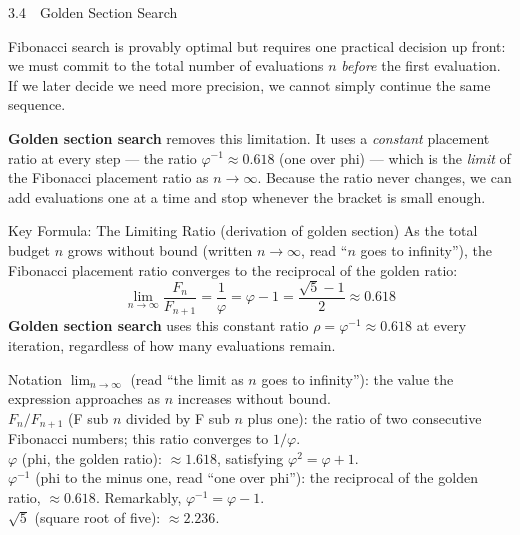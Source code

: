 \documentclass[aspectratio=169,10pt]{beamer}
\begin{document}
\begin{frame}[allowframebreaks]{3.4\ \ Golden Section Search}

  Fibonacci search is provably optimal but requires one practical decision
  up front: we must commit to the total number of evaluations $n$
  \emph{before} the first evaluation.  If we later decide we need more
  precision, we cannot simply continue the same sequence.

  \textbf{Golden section search} removes this limitation.  It uses a
  \emph{constant} placement ratio at every step --- the ratio $\varphi^{-1}
  \approx 0.618$ (one over phi) --- which is the \emph{limit} of the
  Fibonacci placement ratio as $n \to \infty$.  Because the ratio never
  changes, we can add evaluations one at a time and stop whenever the
  bracket is small enough.

  \begin{block}{Key Formula: The Limiting Ratio (derivation of golden section)}
    As the total budget $n$ grows without bound (written $n \to \infty$,
    read ``$n$ goes to infinity''), the Fibonacci placement ratio converges
    to the reciprocal of the golden ratio:
    \[
      \lim_{n \to \infty} \frac{F_n}{F_{n+1}} = \frac{1}{\varphi}
      = \varphi - 1 = \frac{\sqrt{5} - 1}{2} \approx 0.618
    \]
    \textbf{Golden section search} uses this constant ratio $\rho = \varphi^{-1}
    \approx 0.618$ at every iteration, regardless of how many evaluations
    remain.
  \end{block}

  \begin{block}{Notation}
    $\lim_{n \to \infty}$ (read ``the limit as $n$ goes to infinity''):
    the value the expression approaches as $n$ increases without bound.\\
    $F_n / F_{n+1}$ (F sub $n$ divided by F sub $n$ plus one): the ratio
    of two consecutive Fibonacci numbers; this ratio converges to $1/\varphi$.\\
    $\varphi$ (phi, the golden ratio): $\approx 1.618$, satisfying
    $\varphi^2 = \varphi + 1$.\\
    $\varphi^{-1}$ (phi to the minus one, read ``one over phi''): the
    reciprocal of the golden ratio, $\approx 0.618$.  Remarkably,
    $\varphi^{-1} = \varphi - 1$.\\
    $\sqrt{5}$ (square root of five): $\approx 2.236$.
  \end{block}


\end{frame}
\end{document}
